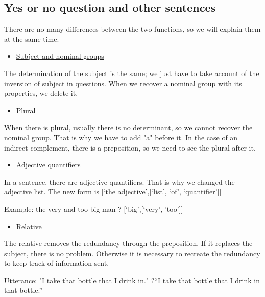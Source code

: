 \documentclass[twoside,a4paper,10pt]{report}
\begin{document}
\subsection{Yes or no question and other sentences}
\label{b250d357238309c118ecc37bb80c574b}%
There are no many differences between the two functions, so we will explain them at the same time.



\begin{itemize}
    \item  \underline{Subject and nominal groups}
\end{itemize}
The determination of the subject is the same; we just have to take account of the inversion of subject in questions.
When we recover a nominal group with its properties, we delete it.



\begin{itemize}
    \item  \underline{Plural}
\end{itemize}
When there is plural, usually there is no determinant, so we cannot recover the nominal group. That is why we have to add "a" before it. In the case of an indirect complement, there is a preposition, so we need to see the plural after it.



\begin{itemize}
    \item  \underline{Adjective quantifiers}
\end{itemize}
In a sentence, there are adjective quantifiers. That is why we changed the adjective list. The new form is [‘the adjective’,[‘list’, ‘of’, ‘quantifier’]]


\small
\begin{verbatimtab}
  Example: the very and too big man ? [‘big’,[‘very’, ’too’]]
\end{verbatimtab}
\normalsize

\begin{itemize}
    \item  \underline{Relative}
\end{itemize}
The relative removes the redundancy through the preposition. If it replaces the subject, there is no problem. Otherwise it is necessary to recreate the redundancy to keep track of information sent. 


\small
\begin{verbatimtab}
  Utterance: "I take that bottle that I drink in."
  ?“I take that bottle that I drink in that bottle.”
\end{verbatimtab}
\normalsize
\end{document}
